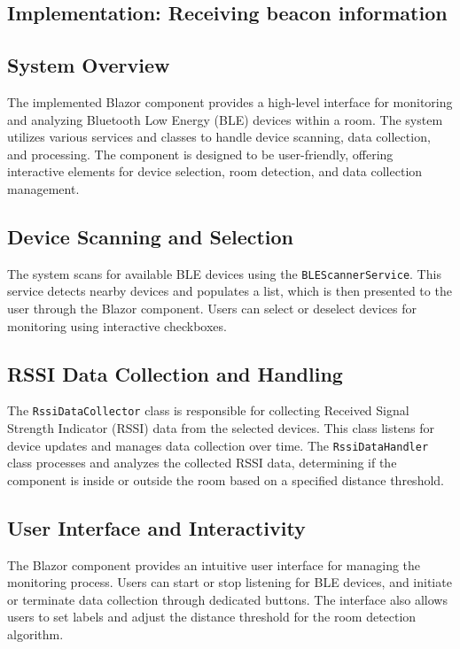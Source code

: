 \subsection{Implementation: Receiving beacon information}\label{sec:ble_implementation}

\subsection{System Overview}
The implemented Blazor component provides a high-level interface for monitoring and analyzing Bluetooth Low Energy (BLE) devices within a room. The system utilizes various services and classes to handle device scanning, data collection, and processing. The component is designed to be user-friendly, offering interactive elements for device selection, room detection, and data collection management.

\subsection{Device Scanning and Selection}
The system scans for available BLE devices using the \texttt{BLEScannerService}. This service detects nearby devices and populates a list, which is then presented to the user through the Blazor component. Users can select or deselect devices for monitoring using interactive checkboxes.

\subsection{RSSI Data Collection and Handling}
The \texttt{RssiDataCollector} class is responsible for collecting Received Signal Strength Indicator (RSSI) data from the selected devices. This class listens for device updates and manages data collection over time. The \texttt{RssiDataHandler} class processes and analyzes the collected RSSI data, determining if the component is inside or outside the room based on a specified distance threshold.

\subsection{User Interface and Interactivity}
The Blazor component provides an intuitive user interface for managing the monitoring process. Users can start or stop listening for BLE devices, and initiate or terminate data collection through dedicated buttons. The interface also allows users to set labels and adjust the distance threshold for the room detection algorithm.

